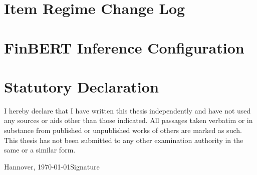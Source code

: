 \documentclass[12pt,a4paper,oneside]{report}
\begin{document}
\chapter{Item Regime Change Log}
\label{app:regime}
%

\chapter{FinBERT Inference Configuration}
\label{app:finbert_config}

\chapter*{Statutory Declaration}
I hereby declare that I have written this thesis independently and have not used any sources or aids other than those indicated. All passages taken verbatim or in substance from published or unpublished works of others are marked as such. This thesis has not been submitted to any other examination authority in the same or a similar form.

\vspace{2cm}
\noindent Hannover, \today \hfill Signature
\end{document}
